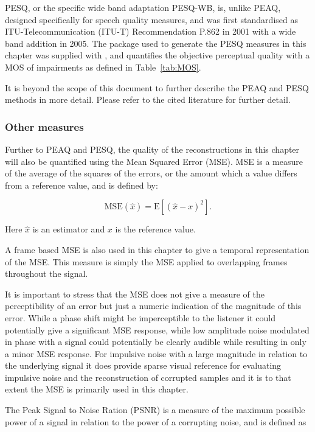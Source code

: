 PESQ, or the specific wide band adaptation PESQ-WB\cite{P862-2-2005}, is, unlike PEAQ, designed specifically for speech quality measures, and was first standardised as ITU-Telecommunication (ITU-T) Recommendation P.862 in 2001 with a wide band addition in 2005\cite{P862-2-2005}. The package used to generate the PESQ measures in this chapter was supplied with \cite{Loizou2007}, and quantifies the objective perceptual quality with a MOS of impairments as defined in Table~\ref{tab:MOS}.

It is beyond the scope of this document to further describe the PEAQ and PESQ methods in more detail. Please refer to the cited literature for further detail.

\subsubsection{Other measures}
Further to PEAQ and PESQ, the quality of the reconstructions in this chapter will also be quantified using the Mean Squared Error (MSE). MSE is a measure of the average of the squares of the errors, or the amount which a value differs from a reference value, and is defined by:

\begin{equation}\label{eq:MSEdef}
\textrm{MSE}\left(\hat{x}\right) = \textrm{E} \left[ \left( \hat{x} - x \right)^2\right].
\end{equation}

Here $\hat{x}$ is an estimator and $x$ is the reference value.

A frame based MSE is also used in this chapter to give a temporal representation of the MSE. This measure is simply the MSE applied to overlapping frames throughout the signal.

It is important to stress that the MSE does not give a measure of the perceptibility of an error but just a numeric indication of the magnitude of this error. While a phase shift might be imperceptible to the listener it could potentially give a significant MSE response, while low amplitude noise modulated in phase with a signal could potentially be clearly audible while resulting in only a minor MSE response. For impulsive noise with a large magnitude in relation to the underlying signal it does provide sparse visual reference for evaluating impulsive noise and the reconstruction of corrupted samples and it is to that extent the MSE is primarily used in this chapter.

The Peak Signal to Noise Ration (PSNR) is a measure of the maximum possible power of a signal in relation to the power of a corrupting noise, and is defined as

